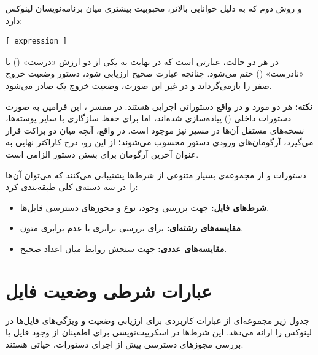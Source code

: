 و روش دوم که به دلیل خوانایی بالاتر، محبوبیت بیشتری میان برنامه‌نویسان لینوکس دارد:

\begin{latin}
\begin{lstlisting}
[ expression ]
\end{lstlisting}
\end{latin}

در هر دو حالت،  عبارتی است که در نهایت به یکی از دو ارزش «درست» () یا «نادرست» () ختم می‌شود. چنانچه عبارت صحیح ارزیابی شود، دستور  وضعیت خروج صفر را بازمی‌گرداند و در غیر این صورت، وضعیت خروج یک صادر می‌شود.

\begin{note}
\textbf{نکته:} هر دو مورد  و \cmd{]} در واقع دستوراتی اجرایی هستند. در مفسر ، این فرامین به صورت دستورات داخلی () پیاده‌سازی شده‌اند، اما برای حفظ سازگاری با سایر پوسته‌ها، نسخه‌های مستقل آن‌ها در مسیر  نیز موجود است. در واقع، آنچه میان دو براکت قرار می‌گیرد، آرگومان‌های ورودی دستور \cmd{]} محسوب می‌شوند؛ از این رو، درج کاراکتر نهایی \cmd{]} به عنوان آخرین آرگومان برای بستن دستور الزامی است.
\end{note}

دستورات  و \cmd{]} از مجموعه‌ی بسیار متنوعی از شرط‌ها پشتیبانی می‌کنند که می‌توان آن‌ها را در سه دسته‌ی کلی طبقه‌بندی کرد:

\begin{itemize}
  \item \textbf{شرط‌های فایل:} جهت بررسی وجود، نوع و مجوزهای دسترسی فایل‌ها.
  \item \textbf{مقایسه‌های رشته‌ای:} برای بررسی برابری یا عدم برابری متون.
  \item \textbf{مقایسه‌های عددی:} جهت سنجش روابط میان اعداد صحیح.
\end{itemize}

\section{عبارات شرطی وضعیت فایل}

جدول زیر مجموعه‌ای از عبارات کاربردی برای ارزیابی وضعیت و ویژگی‌های فایل‌ها در لینوکس را ارائه می‌دهد. این شرط‌ها در اسکریپت‌نویسی برای اطمینان از وجود فایل یا بررسی مجوزهای دسترسی پیش از اجرای دستورات، حیاتی هستند.

